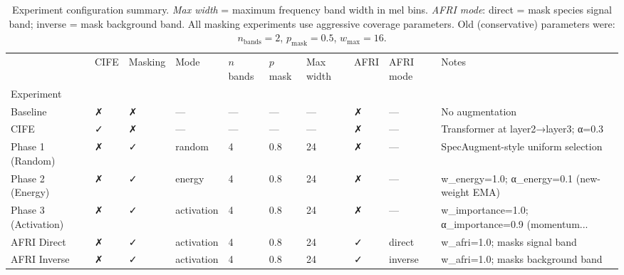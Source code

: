 \begin{table}
\centering
\caption{Experiment configuration summary. \emph{Max width} = maximum frequency band width in mel bins. \emph{AFRI mode}: direct = mask species signal band; inverse = mask background band. All masking experiments use aggressive coverage parameters. Old (conservative) parameters were: $n_{\text{bands}}=2$, $p_{\text{mask}}=0.5$, $w_{\text{max}}=16$.}
\label{tab:experiment_config}
\begin{tabular}{llllllllll}
\toprule
{} & CIFE & Masking &        Mode & $n$ bands & $p$ mask & Max width & AFRI & AFRI mode &                                              Notes \\
Experiment           &      &         &             &           &          &           &      &           &                                                    \\
\midrule
Baseline             &    ✗ &       ✗ &           — &         — &        — &         — &    ✗ &         — &                                    No augmentation \\
CIFE                 &    ✓ &       ✗ &           — &         — &        — &         — &    ✗ &         — &                Transformer at layer2→layer3; α=0.3 \\
Phase 1 (Random)     &    ✗ &       ✓ &      random &         4 &      0.8 &        24 &    ✗ &         — &                SpecAugment-style uniform selection \\
Phase 2 (Energy)     &    ✗ &       ✓ &      energy &         4 &      0.8 &        24 &    ✗ &         — &      w\_energy=1.0; α\_energy=0.1 (new-weight EMA) \\
Phase 3 (Activation) &    ✗ &       ✓ &  activation &         4 &      0.8 &        24 &    ✗ &         — &  w\_importance=1.0; α\_importance=0.9 (momentum... \\
AFRI Direct          &    ✗ &       ✓ &  activation &         4 &      0.8 &        24 &    ✓ &    direct &                     w\_afri=1.0; masks signal band \\
AFRI Inverse         &    ✗ &       ✓ &  activation &         4 &      0.8 &        24 &    ✓ &   inverse &                 w\_afri=1.0; masks background band \\
\bottomrule
\end{tabular}
\end{table}

